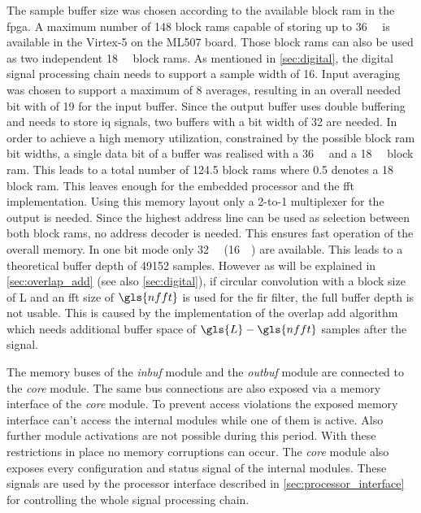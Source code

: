 \documentclass[12pt,a4paper,parskip=full,abstract=true,BCOR=12mm]{scrreprt}
\def\device#1{\mbox{\textit{#1}}}
\begin{document}
The sample buffer size was chosen according to the available block
\gls{ram} in the \gls{fpga}. A maximum number of \num{148} block \glspl{ram} capable of
storing up to \SI{36}{\kilo\bit} is available in the \mbox{Virtex-5} on the ML507 board\cite{virtex5ds}. Those block \glspl{ram}
can also be used as two independent \SI{18}{\kilo\bit} block \glspl{ram}. As
mentioned in \cref{sec:digital}, the digital signal processing chain needs to support a sample width
of \SI{16}{\bit}. Input averaging was chosen to support a maximum of \num{8} averages,
resulting in an overall needed bit with of \SI{19}{\bit} for the input buffer. Since
the output buffer uses double buffering and needs to store \gls{iq} signals,
two buffers with a bit width of \SI{32}{\bit} are needed. In order to achieve a high memory utilization,
constrained by the possible block \gls{ram} bit widths, a single data bit of a buffer was
realised with a \SI{36}{\kilo\bit} and a \SI{18}{\kilo\bit} block \gls{ram}. This leads
to a total number of \num{124.5} block \glspl{ram} where \num{0.5} denotes a
\SI{18}{\kilo\bit} block \gls{ram}. This leaves enough for the embedded processor
and the \gls{fft} implementation. Using this memory layout only a 2-to-1 multiplexer
for the output is needed. Since the highest address line can
be used as selection between both block \glspl{ram}, no address decoder is needed. This ensures fast operation of the
overall memory. In one bit mode only \SI{32}{\kilo\bit} (\SI{16}{\kilo\bit})
are available. This leads to a theoretical buffer depth of \num{49152} samples. However as
will be explained in \cref{sec:overlap_add} (see also \cref{sec:digital}), if circular convolution
with a block size of \gls{L} and an \gls{fft} size of $\gls{nfft}$ is used for the \gls{fir} filter,
the full buffer depth is not usable. This is caused by the implementation of the overlap add
algorithm which needs additional buffer space of $\gls{L} - \gls{nfft}$ samples after the signal.

The memory buses of the \device{inbuf} module and the \device{outbuf} module are
connected to the \device{core} module. The same bus connections are also exposed
via a memory interface of the \device{core} module. To prevent access violations
the exposed memory interface can't access the internal modules while one of
them is active. Also further module activations are not possible
during this period. With these restrictions in place no memory corruptions can
occur. The \device{core} module also exposes every configuration and status signal
of the internal modules. These signals are used by the processor interface described
in \cref{sec:processor_interface} for controlling the whole signal processing chain.
\end{document}
